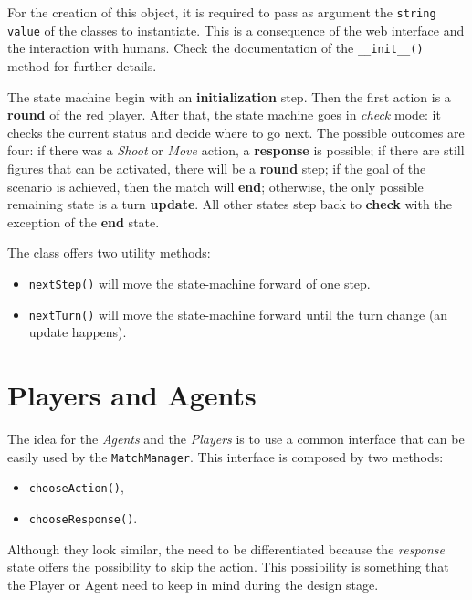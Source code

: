 \documentclass[a4paper]{report}
\begin{document}
	For the creation of this object, it is required to pass as argument the \texttt{string value} of the classes to instantiate. This is a consequence of the web interface and the interaction with humans. Check the documentation of the \texttt{\_\_init\_\_()} method for further details.
	
	The state machine begin with an \textbf{initialization} step. Then the first action is a \textbf{round} of the red player. After that, the state machine goes in \textit{check} mode: it checks the current status and decide where to go next. The possible outcomes are four: if there was a \textit{Shoot} or \textit{Move} action, a \textbf{response} is possible; if there are still figures that can be activated, there will be a \textbf{round} step; if the goal of the scenario is achieved, then the match will \textbf{end}; otherwise, the only possible remaining state is a turn \textbf{update}. All other states step back to \textbf{check} with the exception of the \textbf{end} state.

	The class offers two utility methods:
	
	\begin{itemize}
		\item \texttt{nextStep()} will move the state-machine forward of one step.
		\item \texttt{nextTurn()} will move the state-machine forward until the turn change (an update happens).
	\end{itemize}


	\chapter{Players and Agents}

	The idea for the \textit{Agents} and the \textit{Players} is to use a common interface that can be easily used by the \texttt{MatchManager}. This interface is composed by two methods:

	\begin{itemize}
		\item \texttt{chooseAction()},
		\item \texttt{chooseResponse()}.
	\end{itemize}

	Although they look similar, the need to be differentiated because the \textit{response} state offers the possibility to skip the action. This possibility is something that the Player or Agent need to keep in mind during the design stage.
\end{document}
